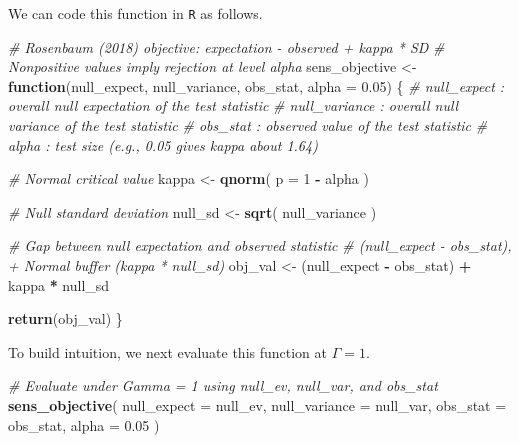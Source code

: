 \documentclass[
  12pt,
  leqno]{article}
\newenvironment{Shaded}{\begin{snugshade}}{\end{snugshade}}
\newcommand{\AttributeTok}[1]{\textcolor[rgb]{0.13,0.29,0.53}{#1}}
\newcommand{\CommentTok}[1]{\textcolor[rgb]{0.56,0.35,0.01}{\textit{#1}}}
\newcommand{\ControlFlowTok}[1]{\textcolor[rgb]{0.13,0.29,0.53}{\textbf{#1}}}
\newcommand{\DecValTok}[1]{\textcolor[rgb]{0.00,0.00,0.81}{#1}}
\newcommand{\FloatTok}[1]{\textcolor[rgb]{0.00,0.00,0.81}{#1}}
\newcommand{\FunctionTok}[1]{\textcolor[rgb]{0.13,0.29,0.53}{\textbf{#1}}}
\newcommand{\NormalTok}[1]{#1}
\newcommand{\OtherTok}[1]{\textcolor[rgb]{0.56,0.35,0.01}{#1}}
\newcommand{\SpecialCharTok}[1]{\textcolor[rgb]{0.81,0.36,0.00}{\textbf{#1}}}
\begin{document}
We can code this function in \texttt{R} as follows.

\singlespacing

\begin{Shaded}
\begin{Highlighting}[]
\CommentTok{\# Rosenbaum (2018) objective: expectation {-} observed + kappa * SD}
\CommentTok{\# Nonpositive values imply rejection at level alpha}
\NormalTok{sens\_objective }\OtherTok{\textless{}{-}} \ControlFlowTok{function}\NormalTok{(null\_expect,}
\NormalTok{                           null\_variance,}
\NormalTok{                           obs\_stat,}
                           \AttributeTok{alpha =} \FloatTok{0.05}\NormalTok{) \{}
  \CommentTok{\# null\_expect   : overall null expectation of the test statistic}
  \CommentTok{\# null\_variance : overall null variance of the test statistic}
  \CommentTok{\# obs\_stat      : observed value of the test statistic}
  \CommentTok{\# alpha         : test size (e.g., 0.05 gives kappa about 1.64)}

  \CommentTok{\# Normal critical value}
\NormalTok{  kappa  }\OtherTok{\textless{}{-}} \FunctionTok{qnorm}\NormalTok{(}
    \AttributeTok{p =} \DecValTok{1} \SpecialCharTok{{-}}\NormalTok{ alpha}
\NormalTok{  )}

  \CommentTok{\# Null standard deviation}
\NormalTok{  null\_sd }\OtherTok{\textless{}{-}} \FunctionTok{sqrt}\NormalTok{(}
\NormalTok{    null\_variance}
\NormalTok{  )}

  \CommentTok{\# Gap between null expectation and observed statistic}
  \CommentTok{\# (null\_expect {-} obs\_stat), + Normal buffer (kappa * null\_sd)}
\NormalTok{  obj\_val }\OtherTok{\textless{}{-}}\NormalTok{ (null\_expect }\SpecialCharTok{{-}}\NormalTok{ obs\_stat) }\SpecialCharTok{+}\NormalTok{ kappa }\SpecialCharTok{*}\NormalTok{ null\_sd}

  \FunctionTok{return}\NormalTok{(obj\_val)}
\NormalTok{\}}
\end{Highlighting}
\end{Shaded}

\doublespacing

To build intuition, we next evaluate this function at \(\Gamma = 1\).

\singlespacing

\begin{Shaded}
\begin{Highlighting}[]
\CommentTok{\# Evaluate under Gamma = 1 using null\_ev, null\_var, and obs\_stat}
\FunctionTok{sens\_objective}\NormalTok{(}
  \AttributeTok{null\_expect   =}\NormalTok{ null\_ev,}
  \AttributeTok{null\_variance =}\NormalTok{ null\_var,}
  \AttributeTok{obs\_stat      =}\NormalTok{ obs\_stat,}
  \AttributeTok{alpha         =} \FloatTok{0.05}
\NormalTok{)}
\end{Highlighting}
\end{Shaded}
\end{document}
